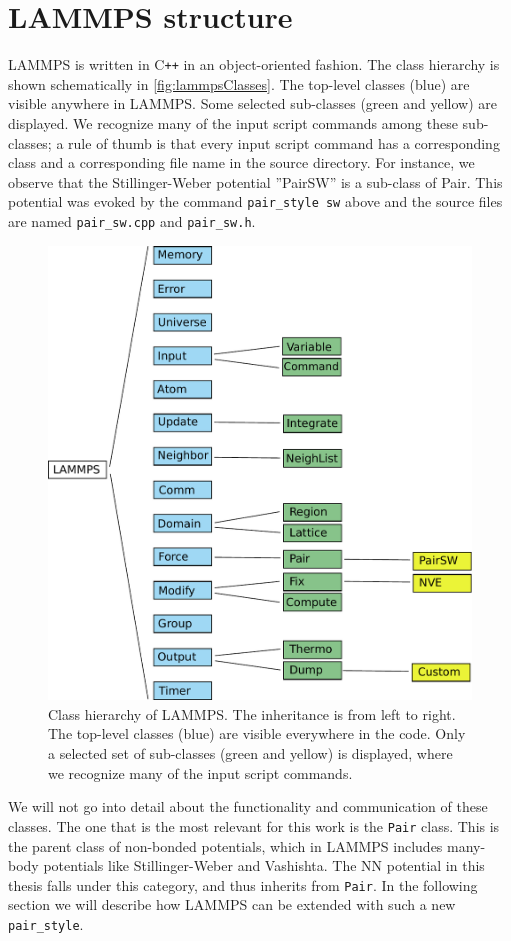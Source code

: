 \documentclass[twoside,english]{uiofysmaster}
\begin{document}
\section{LAMMPS structure}
LAMMPS is written in C\texttt{++} in an object-oriented
fashion. The class hierarchy is shown schematically
in \autoref{fig:lammpsClasses}. 
The top-level classes (blue)
are visible anywhere in LAMMPS.
Some selected sub-classes (green and yellow) are displayed. We recognize many 
of the input script commands among these sub-classes; a rule of thumb is that every input script
command has a corresponding class and a
corresponding file name in the source directory. 
For instance, we observe that the Stillinger-Weber potential ''PairSW'' is a sub-class of Pair.  
This potential was evoked by the command
\texttt{pair\_style sw} above and the source files are named
\texttt{pair\_sw.cpp} and \texttt{pair\_sw.h}. 
\begin{figure}
 \centering
 \includegraphics[width = 0.8\linewidth]{Figures/Implementation/lammpsClasses.pdf}
  \caption{Class hierarchy of LAMMPS. The inheritance is from left to right. 
	   The top-level classes (blue) are visible everywhere in the code. Only a selected set 
	   of sub-classes (green and yellow) is displayed, where we recognize many of the input script
	   commands.}
  \label{fig:lammpsClasses}
\end{figure}

We will not go into detail about the functionality
and communication of these classes. The one
that is the most relevant for this work is the \texttt{Pair} class. 
This is the parent class of non-bonded potentials, which
in LAMMPS includes many-body potentials like Stillinger-Weber and 
Vashishta. The NN potential in this thesis falls 
under this category, and thus inherits from \texttt{Pair}. 
In the following section we will describe how 
LAMMPS can be extended with such a new \texttt{pair\_style}.
\end{document}
